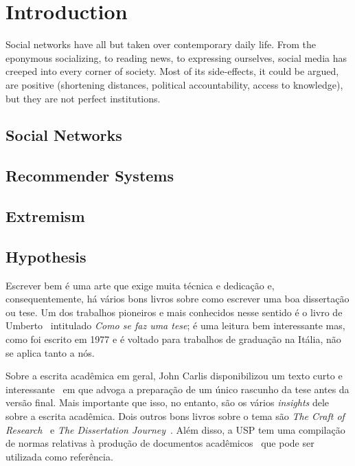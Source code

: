 
\chapter{Introduction}
\label{cap:introduction}

Social networks have all but taken over contemporary daily life. From the
eponymous socializing, to reading news, to expressing ourselves, social media
has creeped into every corner of society. Most of its side-effects, it could be
argued, are positive (shortening distances, political accountability, access to
knowledge), but they are not perfect institutions.

\section{Social Networks}
\label{sec:social_networks}

\section{Recommender Systems}
\label{sec:recommender_systems}

\section{Extremism}
\label{sec:extremism}

\section{Hypothesis}
\label{sec:hypothesis}

Escrever bem é uma arte que exige muita técnica e dedicação e,
consequentemente, há vários bons livros sobre como escrever uma boa
dissertação ou tese. Um dos trabalhos pioneiros e mais conhecidos nesse
sentido é o livro de
Umberto~\citet{eco:09} %
intitulado \emph{Como se faz uma tese}; é uma leitura bem interessante mas,
como foi escrito em 1977 e é voltado para trabalhos de graduação na Itália,
não se aplica tanto a nós.

Sobre a escrita acadêmica em geral, John Carlis disponibilizou um texto curto
e interessante~\citep{carlis:09} em que advoga a preparação de um único
rascunho da tese antes da versão final. Mais importante que isso, no
entanto, são os vários \textit{insights} dele sobre a escrita acadêmica.
Dois outros bons livros sobre o tema são \emph{The Craft of Research}~\citep{craftresearch}
e \emph{The Dissertation Journey}~\citep{dissertjourney}. Além disso, a USP
tem uma compilação de normas relativas à produção de documentos
acadêmicos~\citep{usp:guidelines} que pode ser utilizada como referência.

